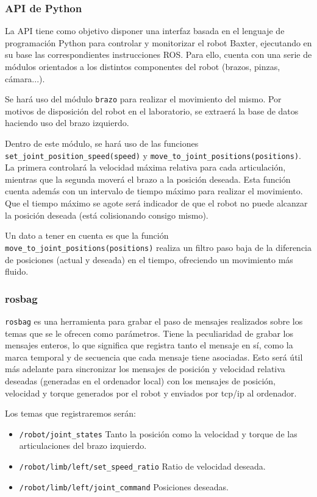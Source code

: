 \subsubsection{API de Python}
La API tiene como objetivo disponer una interfaz basada en el lenguaje de programación Python para controlar y monitorizar el robot Baxter, ejecutando en su base las correspondientes instrucciones ROS. Para ello, cuenta con una serie de módulos orientados a los distintos componentes del robot (brazos, pinzas, cámara...).

Se hará uso del módulo \verb|brazo| para realizar el movimiento del mismo. Por motivos de disposición del robot en el laboratorio, se extraerá la base de datos haciendo uso del brazo izquierdo.

Dentro de este módulo, se hará uso de las funciones \verb|set_joint_position_speed(speed)| y \verb|move_to_joint_positions(positions)|. La primera controlará la velocidad máxima relativa para cada articulación, mientras que la segunda moverá el brazo a la posición deseada. Esta función cuenta además con un intervalo de tiempo máximo para realizar el movimiento. Que el tiempo máximo se agote será indicador de que el robot no puede alcanzar la posición deseada (está colisionando consigo mismo).

Un dato a tener en cuenta es que la función \verb|move_to_joint_positions(positions)| realiza un filtro paso baja de la diferencia de posiciones (actual y deseada) en el tiempo, ofreciendo un movimiento más fluido.

\subsubsection{rosbag}
\verb|rosbag| es una herramienta para grabar el paso de mensajes realizados sobre los temas que se le ofrecen como parámetros. Tiene la peculiaridad de grabar los mensajes enteros, lo que significa que registra tanto el mensaje en sí, como la marca temporal y de secuencia que cada mensaje tiene asociadas. Esto será útil más adelante para sincronizar los mensajes de posición y velocidad relativa deseadas (generadas en el ordenador local) con los mensajes de posición, velocidad y torque generados por el robot y enviados por tcp/ip al ordenador.

Los temas que registraremos serán:

\begin{itemize}
\item \verb|/robot/joint_states| Tanto la posición como la velocidad y torque de las articulaciones del brazo izquierdo.
\item \verb|/robot/limb/left/set_speed_ratio| Ratio de velocidad deseada.
\item \verb|/robot/limb/left/joint_command| Posiciones deseadas.
\end{itemize}

